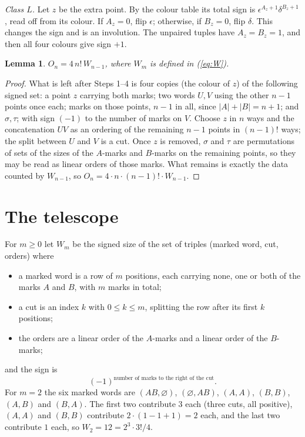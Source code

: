 \documentclass[11pt]{amsart}
\newtheorem{lemma}[theorem]{Lemma}
\theoremstyle{remark}
\begin{document}
\noindent\emph{Class $L$.} Let $z$ be the extra point. By the colour table its total sign is
$\epsilon^{A_z+1}\delta^{B_z+1}$, read off from its colour. If $A_z=0$, flip $\epsilon$; otherwise, if $B_z=0$, flip
$\delta$. This changes the sign and is an involution. The unpaired tuples have $A_z=B_z=1$, and then all four colours
give sign $+1$.

\begin{lemma}\label{lem:cancel}
$O_n=4\,n!\,W_{n-1}$, where $W_m$ is defined in (\ref{eq:W}).
\end{lemma}

\begin{proof}
What is left after Steps 1--4 is four copies (the colour of $z$) of the following signed set: a point $z$ carrying
both marks; two words $U,V$ using the other $n-1$ points once each; marks on those points, $n-1$ in all, since
$|A|+|B|=n+1$; and $\sigma,\tau$; with sign $(-1)$ to the number of marks on $V$. Choose $z$ in $n$ ways and the
concatenation $UV$ as an ordering of the remaining $n-1$ points in $(n-1)!$ ways; the split between $U$ and $V$ is a
cut. Once $z$ is removed, $\sigma$ and $\tau$ are permutations of sets of the sizes of the $A$-marks and $B$-marks on
the remaining points, so they may be read as linear orders of those marks. What remains is exactly the data counted
by $W_{n-1}$, so $O_n=4\cdot n\cdot(n-1)!\cdot W_{n-1}$.
\end{proof}

\section{The telescope}\label{sec:W}

For $m\ge0$ let $W_m$ be the signed size of the set of triples (marked word, cut, orders) where
\begin{itemize}
\item a marked word is a row of $m$ positions, each carrying none, one or both of the marks $A$ and $B$, with $m$
marks in total;
\item a cut is an index $k$ with $0\le k\le m$, splitting the row after its first $k$ positions;
\item the orders are a linear order of the $A$-marks and a linear order of the $B$-marks;
\end{itemize}
and the sign is
\begin{equation}\label{eq:W}
  (-1)^{\text{number of marks to the right of the cut}}.
\end{equation}
For $m=2$ the six marked words are $(AB,\varnothing)$, $(\varnothing,AB)$, $(A,A)$, $(B,B)$, $(A,B)$ and $(B,A)$. The
first two contribute $3$ each (three cuts, all positive), $(A,A)$ and $(B,B)$ contribute $2\cdot(1-1+1)=2$ each,
and the last two contribute $1$ each, so $W_2=12=2^3\cdot3!/4$.
\end{document}
